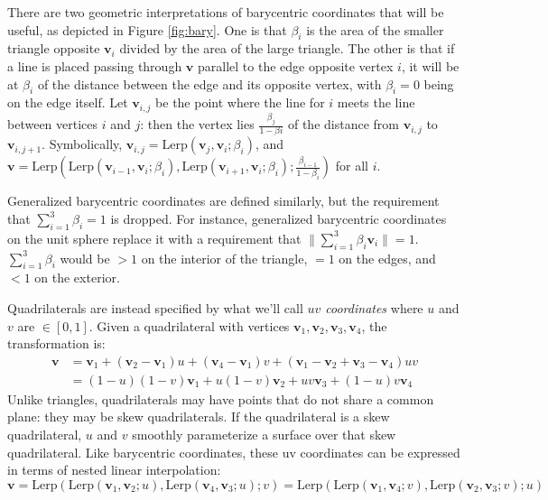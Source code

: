 \documentclass{amsart}[12pt]
\begin{document}
There are two geometric interpretations of barycentric coordinates that will be
useful, as depicted in Figure \ref{fig:bary}. One is that $\beta_i$ is the area
of the smaller triangle opposite $\mathbf v_i$ divided by the area of the large
triangle.
The other is that if a line is placed passing through $\mathbf v$ parallel to
the edge opposite vertex $i$, it will be at $\beta_i$ of the distance between
the edge and its opposite vertex, with $\beta_i = 0$ being on the edge itself.
Let $\mathbf v_{i,j}$ be the point where the line for $i$ meets the line between
vertices $i$ and $j$: then the vertex lies $\frac{\beta_{j}}{1-\beta{i}}$
of the distance from $\mathbf v_{i,j}$ to $\mathbf v_{i,j+1}$. Symbolically,
$\mathbf v_{i,j} = \mathrm{Lerp}(\mathbf v_{j},\mathbf v_i;\beta_{i})$, and
$\mathbf v = \mathrm{Lerp}(\mathrm{Lerp}(\mathbf v_{i-1}, \mathbf v_i;
\beta_{i}), \mathrm{Lerp}(\mathbf v_{i+1}, \mathbf v_i; \beta_{i});
\frac{\beta_{i-1}}{1-\beta_{i}})$ for all $i$.

Generalized barycentric coordinates are defined similarly, but the requirement
that $\sum^3_{i=1} \beta_i = 1$ is dropped. For instance, generalized
barycentric coordinates on the unit sphere replace it with a requirement that
$\| \sum^3_{i=1} \beta_i \mathbf v_i \| = 1$. $\sum^3_{i=1} \beta_i$ would be
$>1$ on the interior of the triangle, $=1$ on the edges,
and $<1$ on the exterior.

Quadrilaterals are instead specified by what we'll call \textit{$uv$
coordinates} where $u$ and $v$ are $\in [0, 1]$. Given a quadrilateral with
vertices $\mathbf v_1, \mathbf v_2, \mathbf v_3, \mathbf v_4$, the
transformation is:
\begin{equation}\begin{split}
\mathbf v & = \mathbf v_1 + (\mathbf v_2-\mathbf v_1) u + (\mathbf v_4-
\mathbf v_1) v + (\mathbf v_1-\mathbf v_2+\mathbf v_3-\mathbf v_4)uv \\
& = (1-u)(1-v)\mathbf v_1 + u(1-v)\mathbf v_2 + uv\mathbf v_3 +
(1-u)v \mathbf v_4
\end{split}\end{equation}
Unlike triangles, quadrilaterals may have points that do not share a common
plane: they may be skew quadrilaterals. If the quadrilateral is a skew
quadrilateral, $u$ and $v$ smoothly parameterize a surface over that skew
quadrilateral. Like barycentric coordinates, these uv coordinates can be
expressed in terms of nested linear interpolation:
$\mathbf v
= \mathrm{Lerp}(\mathrm{Lerp}(\mathbf v_1,\mathbf v_2;u),
\mathrm{Lerp}(\mathbf v_4,\mathbf v_3;u);v)
= \mathrm{Lerp}(\mathrm{Lerp}(\mathbf v_1,\mathbf v_4;v),
\mathrm{Lerp}(\mathbf v_2,\mathbf v_3;v);u)$
\end{document}
